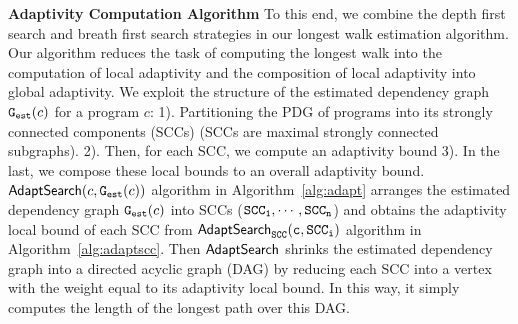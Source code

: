 \textbf{Adaptivity Computation Algorithm}
To this end, we combine the 
depth first search and breath first search strategies in our longest walk estimation algorithm.
%
Our algorithm reduces the task of computing the longest walk into the computation of local adaptivity and the composition of
local adaptivity into global adaptivity.
%
We exploit the structure of the estimated dependency graph $\mathtt{{G_{est}}}(c)$ for a program $c$: 
1). Partitioning the PDG of programs into its strongly connected components (SCCs) (SCCs are maximal strongly connected subgraphs).
2). Then, for each SCC, we compute an adaptivity bound
3). In the last, we compose these local bounds to an overall adaptivity bound.
%
$\mathsf{AdaptSearch}(c, \mathtt{{G_{est}}}(c))$ algorithm in Algorithm~\ref{alg:adapt} arranges the estimated dependency graph $\mathtt{{G_{est}}}(c)$ into SCCs ($\mathtt{SCC_1}, \cdots, \mathtt{SCC_n}$) and obtains the adaptivity local bound of each SCC from $\mathtt{\mathsf{AdaptSearch}_{SCC}(c, SCC_i)}$ algorithm in Algorithm~\ref{alg:adaptscc}.
Then $\mathsf{AdaptSearch}$ shrinks the estimated dependency graph into a directed acyclic graph (DAG) by reducing each SCC into a vertex with the weight equal to its adaptivity local bound.
In this way, it simply computes the length of the longest path over this DAG.

